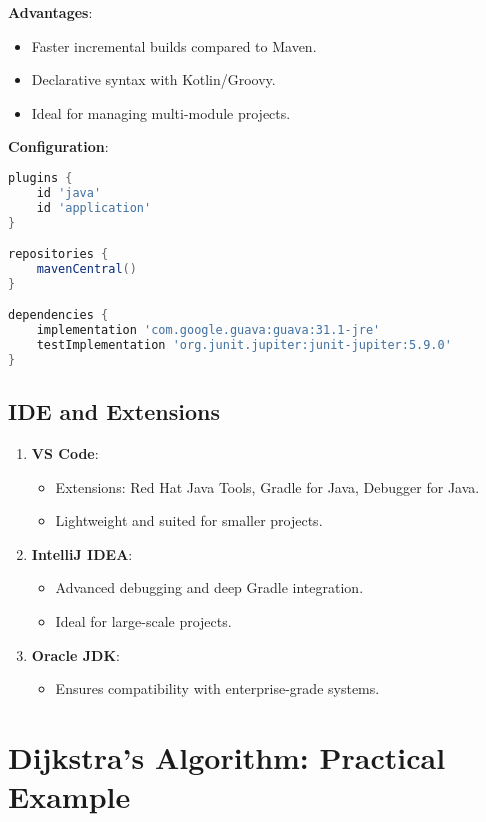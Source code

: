 \documentclass{article}
\begin{document}
\textbf{Advantages}:
\begin{itemize}
    \item Faster incremental builds compared to Maven.
    \item Declarative syntax with Kotlin/Groovy.
    \item Ideal for managing multi-module projects.
\end{itemize}

\textbf{Configuration}:

\begin{lstlisting}[language=Groovy, caption=Gradle Build Script]
plugins {
    id 'java'
    id 'application'
}

repositories {
    mavenCentral()
}

dependencies {
    implementation 'com.google.guava:guava:31.1-jre'
    testImplementation 'org.junit.jupiter:junit-jupiter:5.9.0'
}
\end{lstlisting}

\subsection{IDE and Extensions}

\begin{enumerate}
    \item \textbf{VS Code}:
    \begin{itemize}
        \item Extensions: Red Hat Java Tools, Gradle for Java, Debugger for Java.
        \item Lightweight and suited for smaller projects.
    \end{itemize}
    \item \textbf{IntelliJ IDEA}:
    \begin{itemize}
        \item Advanced debugging and deep Gradle integration.
        \item Ideal for large-scale projects.
    \end{itemize}
    \item \textbf{Oracle JDK}:
    \begin{itemize}
        \item Ensures compatibility with enterprise-grade systems.
    \end{itemize}
\end{enumerate}

\section{Dijkstra’s Algorithm: Practical Example}
\end{document}
